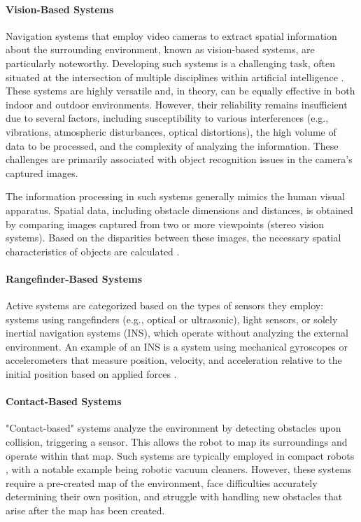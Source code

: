 \paragraph{Vision-Based Systems}
Navigation systems that employ video cameras to extract spatial information about the surrounding environment, known as vision-based systems, are particularly noteworthy. Developing such systems is a challenging task, often situated at the intersection of multiple disciplines within artificial intelligence \citep{Jin2019, PointLightYang}. These systems are highly versatile and, in theory, can be equally effective in both indoor and outdoor environments. However, their reliability remains insufficient due to several factors, including susceptibility to various interferences (e.g., vibrations, atmospheric disturbances, optical distortions), the high volume of data to be processed, and the complexity of analyzing the information. These challenges are primarily associated with object recognition issues in the camera's captured images.

The information processing in such systems generally mimics the human visual apparatus. Spatial data, including obstacle dimensions and distances, is obtained by comparing images captured from two or more viewpoints (stereo vision systems). Based on the disparities between these images, the necessary spatial characteristics of objects are calculated \citep{Smith2019, Doe2020}.

\paragraph{Rangefinder-Based Systems}
Active systems are categorized based on the types of sensors they employ: systems using rangefinders (e.g., optical or ultrasonic), light sensors, or solely inertial navigation systems (INS), which operate without analyzing the external environment. An example of an INS is a system using mechanical gyroscopes or accelerometers that measure position, velocity, and acceleration relative to the initial position based on applied forces 
.

\paragraph{Contact-Based Systems}
"Contact-based" systems analyze the environment by detecting obstacles upon collision, triggering a sensor. This allows the robot to map its surroundings and operate within that map. Such systems are typically employed in compact robots \citep{Borenstein1994UMBmarkA}, with a notable example being robotic vacuum cleaners. However, these systems require a pre-created map of the environment, face difficulties accurately determining their own position, and struggle with handling new obstacles that arise after the map has been created.















